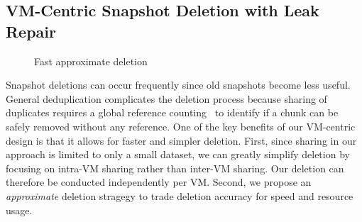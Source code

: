 
\subsection{VM-Centric Snapshot Deletion with Leak Repair}
\label{sect:delete}


\begin{figure}[htbp]
  \centering
  \caption{Fast approximate deletion}
  \label{fig:deletion_flow}
\end{figure}

Snapshot deletions can occur frequently since old snapshots become less useful.
General deduplication complicates the deletion process because sharing of duplicates
requires a global reference counting~\cite{Guo2011,Fabiano2013} 
 to identify if  a chunk can be  safely removed without any reference.
One of the key benefits of our VM-centric design is that it allows for faster and simpler deletion. First, since
sharing in our approach is limited to only a small dataset, we can greatly simplify deletion by focusing
on intra-VM sharing rather than inter-VM sharing. Our deletion can therefore be conducted independently per VM.
Second, we propose an {\em approximate} deletion stragegy to trade deletion accuracy for speed and
resource usage.


